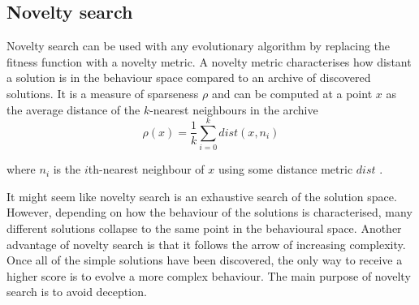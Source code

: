 \subsection{Novelty search}
Novelty search can be used with any evolutionary algorithm by replacing the fitness
function with a novelty metric. A novelty metric characterises how distant a solution
is in the behaviour space compared to an archive of discovered solutions. It is a measure
of sparseness $\rho$ and can be computed at a point $x$ as the average distance of the
$k$-nearest neighbours in the archive
\[
    \rho(x) = \frac{1}{k} \sum_{i=0}^{k} dist(x, n_{i})
\]

where $n_{i}$ is the $i$th-nearest neighbour of $x$ using some distance metric $dist$ \cite{novelty_alone}.

It might seem like novelty search is an exhaustive search of the solution space. However,
depending on how the behaviour of the solutions is characterised, many different solutions
collapse to the same point in the behavioural space. Another advantage of novelty search
is that it follows the arrow of increasing complexity. Once all of the simple solutions
have been discovered, the only way to receive a higher score is to evolve a more complex
behaviour. The main purpose of novelty search is to avoid deception.